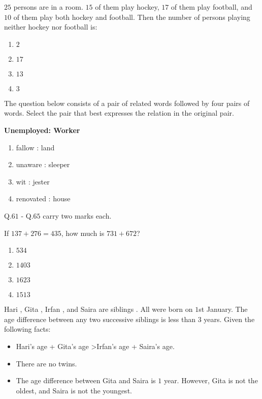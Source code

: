     \item $25$ persons are in a room. $15$ of them play hockey, $17$ of them play football, and $10$ of them play both hockey and football. Then the number of persons playing neither hockey nor football is:

    \begin{enumerate}
        \item $2$
        \item $17$
        \item $13$
        \item $3$
    \end{enumerate}

    \item The question below consists of a pair of related words followed by four pairs of words. Select the pair that best expresses the relation in the original pair.

    \textbf{Unemployed: Worker}

    \begin{enumerate}
        \item fallow : land
        \item unaware : sleeper
        \item wit : jester
        \item renovated : house
    \end{enumerate}


 Q.$61$ - Q.$65$ carry two marks each.


\item  If $137 + 276 = 435$, how much is $731 + 672$?

    \begin{enumerate}
        \item $534$
        \item $1403$
        \item $1623$
        \item $1513$
    \end{enumerate}





    \item Hari , Gita , Irfan , and Saira  are siblings . All were born on $1$st January. The age difference between any two successive siblings  is less than $3$ years. Given the following facts:
    
    \begin{itemize}
        \item Hari's age + Gita's age \textgreater Irfan's age + Saira's age.
        \item There are no twins.
        \item The age difference between Gita and Saira is $1   $ year. However, Gita is not the oldest, and Saira is not the youngest.
    \end{itemize}

